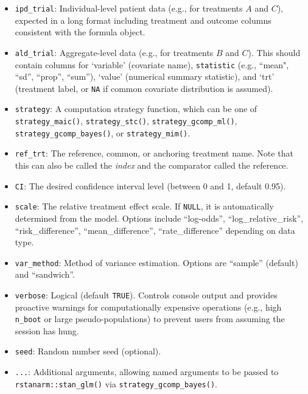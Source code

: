 \documentclass[article]{jss}
\begin{document}
\begin{itemize}[noitemsep,topsep=0pt]
    \item \texttt{ipd\_trial}: Individual-level patient data (e.g., for treatments $A$ and $C$), expected in a long format including treatment and outcome columns consistent with the formula object.
    \item \texttt{ald\_trial}: Aggregate-level data (e.g., for treatments $B$ and $C$). This should contain columns for `variable' (covariate name), \texttt{statistic} (e.g., ``mean", ``sd'', ``prop'', ``sum''), `value' (numerical summary statistic), and `trt' (treatment label, or \texttt{NA} if common covariate distribution is assumed).
    \item \texttt{strategy}: A computation strategy function, which can be one of \texttt{strategy\_maic()}, \texttt{strategy\_stc()}, \texttt{strategy\_gcomp\_ml()}, \texttt{strategy\_gcomp\_bayes()}, or \texttt{strategy\_mim()}.
    \item \texttt{ref\_trt}: The reference, common, or anchoring treatment name. Note that this can also be called the {\it index} and the comparator called the reference.
    \item \texttt{CI}: The desired confidence interval level (between 0 and 1, default 0.95).
    \item \texttt{scale}: The relative treatment effect scale. If \texttt{NULL}, it is automatically determined from the model. Options include ``log-odds'', ``log\_relative\_risk'', ``risk\_difference'', ``mean\_difference'', ``rate\_difference'' depending on data type.
    \item \texttt{var\_method}: Method of variance estimation. Options are ``sample'' (default) and ``sandwich''.
    \item \texttt{verbose}: Logical (default \texttt{TRUE}). Controls console output and provides proactive warnings for computationally expensive operations (e.g., high \texttt{n\_boot} or large pseudo-populations) to prevent users from assuming the session has hung.
    \item \texttt{seed}: Random number seed (optional).
    \item \texttt{...}: Additional arguments, allowing named arguments to be passed to \texttt{rstanarm::stan\_glm()} via \texttt{strategy\_gcomp\_bayes()}.
\end{itemize}
\end{document}

